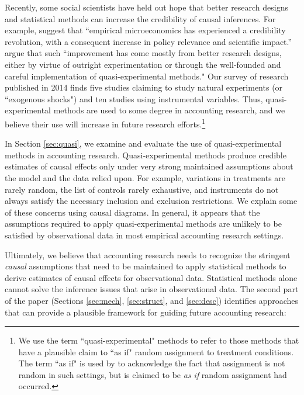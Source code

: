 \documentclass[12pt,reqno,titlepage]{amsart}
\begin{document}
\begin{doublespace}
Recently, some social scientists have held out hope that better research designs and statistical methods can increase the credibility of causal inferences.
For example, \citet{Angrist:2010jv} suggest that ``empirical microeconomics has experienced a credibility revolution, with a consequent increase in policy relevance and scientific impact.''  
\citet[p. 26]{Angrist:2010jv} argue that such ``improvement has come mostly from better research designs, either by virtue of outright experimentation or through the well-founded and careful implementation of quasi-experimental methods."
Our survey of research published in 2014 finds five studies claiming to study natural experiments (or ``exogenous shocks") and ten studies using instrumental variables.
Thus, quasi-experimental methods are used to some degree in accounting research, and we believe their use will increase in future research efforts.\footnote{
We use the term ``quasi-experimental" methods to refer to those methods that have a plausible claim to ``as if" random assignment to treatment conditions.
The term ``as if" is used by \citet{Dunning:2012tt} to acknowledge the fact that assignment is not random in such settings, but is claimed to be \emph{as if} random assignment had occurred.}

In Section \ref{sec:quasi}, we examine and evaluate the use of quasi-experimental methods in accounting research. 
Quasi-experimental methods produce credible estimates of causal effects only under very strong maintained assumptions about the model and the data relied upon. 
For example, variations in treatments are rarely random, the list of controls rarely exhaustive, and instruments do not always satisfy the necessary inclusion and exclusion restrictions.
We explain some of these concerns using causal diagrams.
In general, it appears that the assumptions required to apply quasi-experimental methods are unlikely to be satisfied by observational data in most empirical accounting research settings.

Ultimately, we believe that accounting research needs to recognize the stringent \emph{causal} assumptions that need to be maintained to apply statistical methods to derive estimates of causal effects for observational data.
Statistical methods alone cannot solve the inference issues that arise in observational data. 
The second part of the paper (Sections \ref{sec:mech}, \ref{sec:struct}, and \ref{sec:desc}) identifies approaches that can provide a plausible framework for guiding future accounting research:
% 


\end{doublespace}
\end{document}
